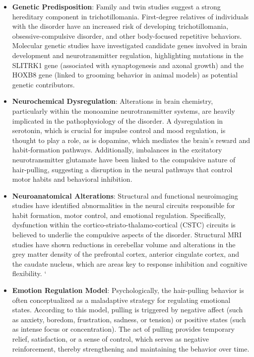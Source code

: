 \begin{itemize}
    \item \textbf{Genetic Predisposition}: Family and twin studies suggest a strong hereditary component in trichotillomania. First-degree relatives of individuals with the disorder have an increased risk of developing trichotillomania, obsessive-compulsive disorder, and other body-focused repetitive behaviors. Molecular genetic studies have investigated candidate genes involved in brain development and neurotransmitter regulation, highlighting mutations in the SLITRK1 gene (associated with synaptogenesis and axonal growth) and the HOXB8 gene (linked to grooming behavior in animal models) as potential genetic contributors.
    \item \textbf{Neurochemical Dysregulation}: Alterations in brain chemistry, particularly within the monoamine neurotransmitter systems, are heavily implicated in the pathophysiology of the disorder. A dysregulation in serotonin, which is crucial for impulse control and mood regulation, is thought to play a role, as is dopamine, which mediates the brain's reward and habit-formation pathways. Additionally, imbalances in the excitatory neurotransmitter glutamate have been linked to the compulsive nature of hair-pulling, suggesting a disruption in the neural pathways that control motor habits and behavioral inhibition.
    \item \textbf{Neuroanatomical Alterations}: Structural and functional neuroimaging studies have identified abnormalities in the neural circuits responsible for habit formation, motor control, and emotional regulation. Specifically, dysfunction within the cortico-striato-thalamo-cortical (CSTC) circuits is believed to underlie the compulsive aspects of the disorder. Structural MRI studies have shown reductions in cerebellar volume and alterations in the grey matter density of the prefrontal cortex, anterior cingulate cortex, and the caudate nucleus, which are areas key to response inhibition and cognitive flexibility.
    \textquoteleft \item \textbf{Emotion Regulation Model}: Psychologically, the hair-pulling behavior is often conceptualized as a maladaptive strategy for regulating emotional states. According to this model, pulling is triggered by negative affect (such as anxiety, boredom, frustration, sadness, or tension) or positive states (such as intense focus or concentration). The act of pulling provides temporary relief, satisfaction, or a sense of control, which serves as negative reinforcement, thereby strengthening and maintaining the behavior over time.

\end{itemize}
